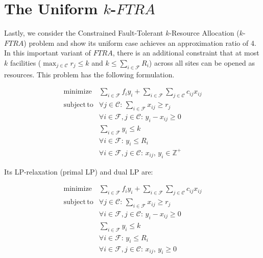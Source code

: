 \documentclass[10pt]{llncs}
\begin{document}
\section{The Uniform $k$-$FTRA$}

Lastly, we consider the Constrained Fault-Tolerant $k$-Resource Allocation
($k$-$FTRA$) problem and show its uniform case achieves an approximation
ratio of 4. In this important variant of $FTRA$, there is an additional
constraint that at most $k$ facilities ($\max_{j\in\mathcal{C}}r_{j}\leq k$
and $k\leq\sum_{i\in\mathcal{F}}R_{i}$) across all sites can be opened
as resources. This problem has the following formulation.

\textit{
\begin{equation}
\begin{array}{llc}
\mathrm{minimize} & \sum_{i\in\mathcal{F}}f_{i}y_{i}+\sum_{i\in\mathcal{F}}\sum_{j\in\mathcal{C}}c_{ij}x_{ij}\\
\mathrm{subject\, to} & \forall j\in\mathcal{C}:\,\sum_{i\in\mathcal{F}}x_{ij}\ge r_{j}\\
 & \forall i\in\mathcal{F},j\in\mathcal{C}:\, y_{i}-x_{ij}\geq0\\
 & \sum_{i\in\mathcal{F}}y_{i}\leq k\\
 & \forall i\in\mathcal{F}:\, y_{i}\leq R_{i}\\
 & \forall i\in\mathcal{F},j\in\mathcal{C}:\, x_{ij},\, y_{i}\in\mathbb{Z}^{+}
\end{array}\label{eq:kftra-ip}
\end{equation}
}

Its LP-relaxation (primal LP) and dual LP are:

\textit{
\begin{equation}
\begin{array}{llc}
\mathrm{minimize} & \sum_{i\in\mathcal{F}}f_{i}y_{i}+\sum_{i\in\mathcal{F}}\sum_{j\in\mathcal{C}}c_{ij}x_{ij}\\
\mathrm{subject\, to} & \forall j\in\mathcal{C}:\,\sum_{i\in\mathcal{F}}x_{ij}\ge r_{j}\\
 & \forall i\in\mathcal{F},j\in\mathcal{C}:\, y_{i}-x_{ij}\geq0\\
 & \sum_{i\in\mathcal{F}}y_{i}\leq k\\
 & \forall i\in\mathcal{F}:\, y_{i}\leq R_{i}\\
 & \forall i\in\mathcal{F},j\in\mathcal{C}:\, x_{ij},\, y_{i}\geq0
\end{array}\label{eq:kftra-lp}
\end{equation}
}
\end{document}
